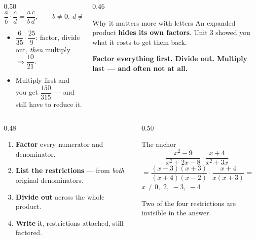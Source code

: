 \documentclass[aspectratio=169, 11pt]{beamer}
\begin{document}
\begin{frame}[t, plain]
  \begin{columns}[T]
    \begin{column}{0.50\textwidth}
      \[ \frac{a}{b}\cdot\frac{c}{d}=\frac{a\,c}{b\,d}, \qquad b\neq0,\ d\neq0 \]
      \begin{itemize}\setlength{\itemsep}{4pt}
        \item $\dfrac{6}{35}\cdot\dfrac{25}{9}$: factor, divide out, \emph{then} multiply
              $\Rightarrow \dfrac{10}{21}$.
        \item Multiply first and you get $\dfrac{150}{315}$ --- and still have to reduce it.
      \end{itemize}
    \end{column}
    \begin{column}{0.46\textwidth}
      \begin{block}{Why it matters more with letters}
        An expanded product \textbf{hides its own factors}. Unit 3 showed you what it costs to get
        them back.
      \end{block}
      \vspace{3pt}
      {\footnotesize \textbf{Factor everything first. Divide out. Multiply last --- and often not at
      all.}}
    \end{column}
  \end{columns}
\end{frame}

\begin{frame}[t, plain]
  \begin{columns}[T]
    \begin{column}{0.48\textwidth}
      \begin{enumerate}\setlength{\itemsep}{5pt}
        \item \textbf{Factor} every numerator and denominator.
        \item \textbf{List the restrictions} --- from \emph{both} original denominators.
        \item \textbf{Divide out} across the whole product.
        \item \textbf{Write} it, restrictions attached, still factored.
      \end{enumerate}
    \end{column}
    \begin{column}{0.50\textwidth}
      \begin{block}{The anchor}
        \[ \frac{x^2-9}{x^2+2x-8}\cdot\frac{x+4}{x^2+3x} \]
        \[ =\frac{(x-3)(x+3)}{(x+4)(x-2)}\cdot\frac{x+4}{x(x+3)}
           =\frac{x-3}{x(x-2)} \]
        \centering $x\neq 0,\;2,\;-3,\;-4$
      \end{block}
      \vspace{2pt}
      {\footnotesize Two of the four restrictions are invisible in the answer.}
    \end{column}
  \end{columns}
\end{frame}
\end{document}
